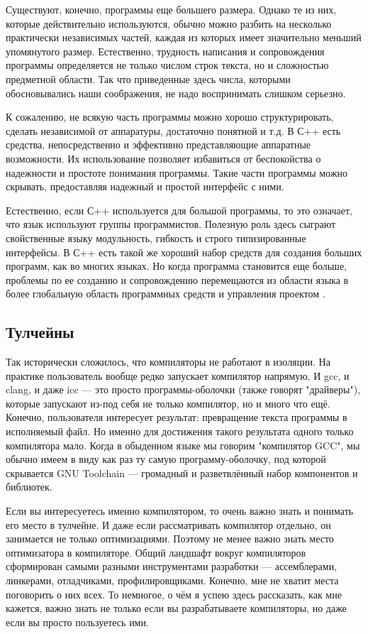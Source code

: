 Существуют, конечно, программы еще большего размера. Однако те из них, которые действительно используются, обычно можно разбить на несколько практически независимых частей, каждая из которых имеет значительно меньший упомянутого размер. Естественно, трудность написания и сопровождения программы определяется не только числом строк текста, но и сложностью предметной области. Так что приведенные здесь числа, которыми обосновывались наши соображения, не надо воспринимать слишком серьезно.

К сожалению, не всякую часть программы можно хорошо структурировать, сделать независимой от аппаратуры, достаточно понятной и т.д. В С++ есть средства, непосредственно и эффективно представляющие аппаратные возможности. Их использование позволяет избавиться от беспокойства о надежности и простоте понимания программы. Такие части программы можно скрывать, предоставляя надежный и простой интерфейс с ними.

Естественно, если С++ используется для большой программы, то это означает, что язык используют группы программистов. Полезную роль здесь сыграют свойственные языку модульность, гибкость и строго типизированные интерфейсы. В С++ есть такой же хороший набор средств для создания больших программ, как во многих языках. Но когда программа становится еще больше, проблемы по ее созданию и сопровождению перемещаются из области языка в более глобальную область программных средств и управления проектом \cite{StroustrupCpp}.


\subsection{Тулчейны}

Так исторически сложилось, что компиляторы не работают в изоляции. На практике пользователь вообще редко запускает компилятор напрямую. И gcc, и clang, и даже icc — это просто программы-оболочки (также говорят "драйверы"), которые запускают из-под себя не только компилятор, но и много что ещё. Конечно, пользователя интересует результат: превращение текста программы в исполняемый файл. Но именно для достижения такого результата одного только компилятора мало. Когда в обыденном языке мы говорим "компилятор GCC", мы обычно имеем в виду как раз ту самую программу-оболочку, под которой скрывается GNU Toolchain — громадный и разветвлённый набор компонентов и библиотек.

Если вы интересуетесь именно компилятором, то очень важно знать и понимать его место в тулчейне. И даже если рассматривать компилятор отдельно, он занимается не только оптимизациями. Поэтому не менее важно знать место оптимизатора в компиляторе.
Общий ландшафт вокруг компиляторов сформирован самыми разными инструментами разработки — ассемблерами, линкерами, отладчиками, профилировщиками. Конечно, мне не хватит места поговорить о них всех. То немногое, о чём я успею здесь рассказать, как мне кажется, важно знать не только если вы разрабатываете компиляторы, но даже если вы просто пользуетесь ими.

